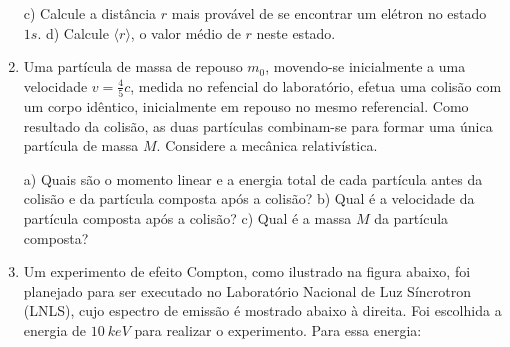 \begin{enumerate}[start=1,label={\bfseries Q\arabic*.}]
  c) Calcule a distância $r$ mais provável de se encontrar um elétron no estado $1s$.
  d) Calcule $\langle r \rangle$, o valor médio de $r$ neste estado.





\item Uma partícula de massa de repouso $m_{0}$, movendo-se inicialmente a uma velocidade $v = \frac{4}{5}c$, medida no refencial do laboratório, efetua uma colisão com um corpo idêntico, inicialmente em repouso no mesmo referencial. Como resultado da colisão, as duas partículas combinam-se para formar uma única partícula de massa $M$. Considere a mecânica relativística.

  a) Quais são o momento linear e a energia total de cada partícula antes da colisão e da partícula composta após a colisão?
  b) Qual é a velocidade da partícula composta após a colisão?
  c) Qual é a massa $M$ da partícula composta?





\item Um experimento de efeito Compton, como ilustrado na figura abaixo, foi planejado para ser executado no Laboratório Nacional de Luz Síncrotron (LNLS), cujo espectro de emissão é mostrado abaixo à direita. Foi escolhida a energia de $10 \ keV$ para realizar o experimento. Para essa energia:


\end{enumerate}
